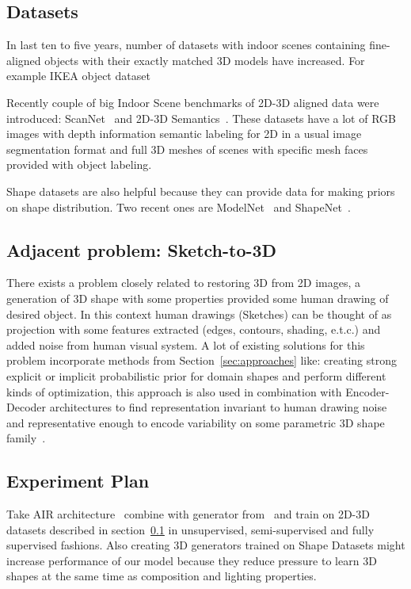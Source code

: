\subsection{Datasets}
\label{sec:datasets}
In last ten to five years, number of datasets with indoor scenes containing fine-aligned objects with their exactly matched 3D models have increased. For example IKEA object dataset~\cite{lim2013parsing}

Recently couple of big Indoor Scene benchmarks of 2D-3D aligned data were introduced: ScanNet~\cite{dai2017scannet} and 2D-3D Semantics~\cite{armeni2017joint}. These datasets have a lot of RGB images with depth information semantic labeling for 2D in a usual image segmentation format and full 3D meshes of scenes with specific mesh faces provided with object labeling.

Shape datasets are also helpful because they can provide data for making priors on shape distribution. Two recent ones are ModelNet~\cite{wu20153d} and ShapeNet~\cite{chang2015shapenet}.

\subsection{Adjacent problem: Sketch-to-3D}

There exists a problem closely related to restoring 3D from 2D images, a generation of 3D shape with some properties provided some human drawing of desired object. In this context human drawings (Sketches) can be thought of as projection with some features extracted (edges, contours, shading, e.t.c.) and added noise from human visual system.
A lot of existing solutions for this problem incorporate methods from Section~\ref{sec:approaches} like: creating strong explicit or implicit probabilistic prior for domain shapes and perform different kinds of optimization, this approach is also used in combination with Encoder-Decoder architectures to find representation invariant to human drawing noise and representative enough to encode variability on some parametric 3D shape family~\cite{han2017deepsketch2face,xu2014true2form,kulkarni2014inverse}.

\subsection{Experiment Plan}

Take AIR architecture~\cite{eslami2016attend} combine with generator from~\cite{rezende2016unsupervised} and train on 2D-3D datasets described in section~\ref{sec:datasets} in unsupervised, semi-supervised and fully supervised fashions.
Also creating 3D generators trained on Shape Datasets might increase performance of our model because they reduce pressure to learn 3D shapes at the same time as composition and lighting properties.

